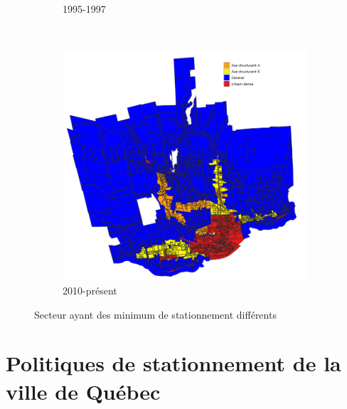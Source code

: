 \begin{figure}[ht]
\begin{subfigure}[t]{0.5\textwidth}
    \caption{1995-1997}
  \end{subfigure}\\
  \begin{subfigure}[t]{0.6\textwidth}
  \centering
  \includegraphics[width=0.8\linewidth]{images/geographie_code_urbanisme_2009_present.png}
  \caption{2010-présent}
  \end{subfigure}
  \caption{Secteur ayant des minimum de stationnement différents}
  \label{fig:types_unites_voisinage}
\end{figure}
\FloatBarrier
\section{Politiques de stationnement de la ville de Québec} \label{sec:politiques_stationnement}

